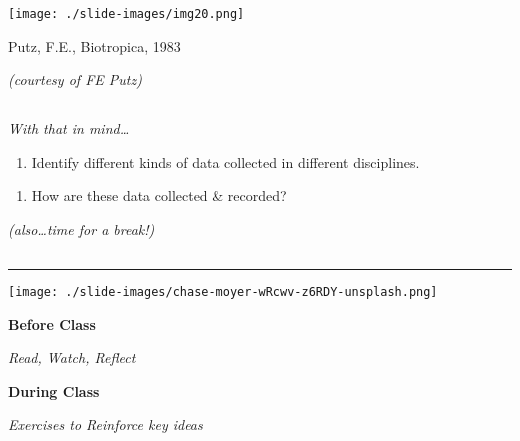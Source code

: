 \documentclass[
  letterpaper,
  DIV=11,
  numbers=noendperiod]{scrartcl}
\providecommand{\tightlist}{%
  \setlength{\itemsep}{0pt}\setlength{\parskip}{0pt}}\usepackage{longtable,booktabs,array}
\begin{document}
\texttt{[image: ./slide-images/img20.png]}

Putz, F.E., Biotropica, 1983

\emph{(courtesy of FE Putz)}

\hypertarget{section-20}{%
\subsection{}\label{section-20}}

\emph{With that in mind\ldots{}}

\begin{enumerate}
\def\labelenumi{\arabic{enumi}.}
\tightlist
\item
  Identify different kinds of data collected in different disciplines.
\end{enumerate}

\begin{enumerate}
\def\labelenumi{\arabic{enumi}.}
\setcounter{enumi}{1}
\tightlist
\item
  How are these data collected \& recorded?
\end{enumerate}

\emph{(also\ldots time for a break!)}

\hypertarget{section-21}{%
\subsection{}\label{section-21}}

\hypertarget{section-22}{%
\subsection{}\label{section-22}}

\hypertarget{section-23}{%
\subsection{}\label{section-23}}

\begin{center}\rule{0.5\linewidth}{0.5pt}\end{center}

\texttt{[image: ./slide-images/chase-moyer-wRcwv-z6RDY-unsplash.png]}

\textbf{Before Class}

\emph{Read, Watch, Reflect}

\textbf{During Class}

\emph{Exercises to Reinforce key ideas}
\end{document}
